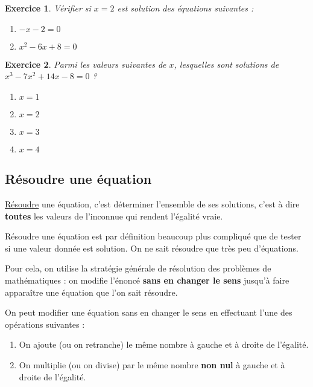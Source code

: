 \documentclass[10pt,a4paper]{book}
\newtheorem{exo}{Exercice}
\begin{document}
\begin{exo} 
Vérifier si $x=2$ est solution des équations suivantes :
    \begin{enumerate}
        \item $-x - 2 = 0$
        \item $x^2 - 6x + 8 = 0$
    \end{enumerate}
\end{exo}

\begin{exo} 
Parmi les valeurs suivantes de $x$, lesquelles sont solutions de $x^3 - 7x^2 + 14x - 8 = 0$ ?
    \begin{enumerate}
        \item $x=1$
        \item $x=2$
        \item $x=3$
        \item $x=4$
    \end{enumerate}
\end{exo}



\subsection{Résoudre une équation}

\begin{de}
    \underline{Résoudre} une équation, c'est déterminer l'ensemble de ses solutions, c'est à dire \textbf{toutes} les valeurs de l'inconnue qui rendent l'égalité vraie.
\end{de}

Résoudre une équation est par définition beaucoup plus compliqué que de tester si une valeur donnée est solution. On ne sait résoudre que très peu d'équations.

Pour cela, on utilise la stratégie générale de résolution des problèmes de mathématiques : on modifie l'énoncé \textbf{sans en changer le sens} jusqu'à faire apparaître une équation que l'on sait résoudre.

\begin{prop}[Admise]
    On peut modifier une équation sans en changer le sens en effectuant l'une des opérations suivantes :
    \begin{enumerate}
        \item On ajoute (ou on retranche) le même nombre à gauche et à droite de l'égalité.
        \item On multiplie (ou on divise) par le même nombre \textbf{non nul} à gauche et à droite de l'égalité.
    \end{enumerate}
\end{prop}
\end{document}
